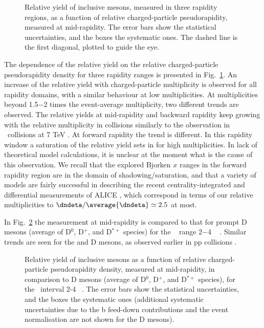 


 \begin{figure}[htb]
  {\centering 
{} 
\par}
\caption{\label{fig:jpsiyield} Relative yield of inclusive \jpsi mesons, measured in three rapidity regions, as a function of relative charged-particle pseudorapidity, measured at mid-rapidity.
The error bars show the statistical uncertainties, and the boxes the systematic ones.
The dashed line is the first diagonal, plotted to guide the eye.
}
\end{figure}

The dependence of the relative \jpsi yield on the relative charged-particle pseudorapidity density for three \jpsi rapidity ranges is presented in Fig.~\ref{fig:jpsiyield}. An increase of the relative yield with charged-particle multiplicity is observed for all rapidity domains, with a similar behaviour at low multiplicities. At multiplicities beyond 1.5$-$2 times the event-average multiplicity, two different trends are observed. The relative yields at mid-rapidity and backward rapidity keep growing with the relative multiplicity in \ppb collisions similarly to the observation in \pp ~collisions at 7 TeV \cite{Abelev:2012aa}. At forward rapidity the trend is different. In this rapidity window a saturation of the relative yield sets in for high multiplicities. In lack of theoretical model calculations, it is unclear at the moment what is the cause of this observation.
We recall that the explored Bjorken $x$ ranges in the forward rapidity region are in the domain of shadowing/saturation, and that a variety of models \cite{Vogt:2013aa,Arleo:2013aa,Ferreiro:2014bia,Ma:2015sia,Ducloue:2015gfa} are fairly successful in describing the recent centrality-integrated and differential measurements of ALICE \cite{Adam:2015ac,Adam:2015jsa}, which correspond in terms of our relative multiplicities to $\dndeta/\average{\dndeta}\simeq2.5$ at most.

In Fig.~\ref{fig:jpsi2d} the \jpsi measurement at mid-rapidity is compared to that for prompt D mesons (average of D$^0$, D$^+$, and D$^{*+}$ species) for the \pt~ range 2$-$4 \gevc~ \cite{Adam:2016mkz}. Similar trends are seen for the \jpsi and D mesons, as observed earlier in pp collisions \cite{Adam:2015ota}. 

 \begin{figure}[htb]
  {\centering 
{}
\par}
\caption{\label{fig:jpsi2d} Relative yield of inclusive \jpsi mesons as a function of relative charged-particle pseudorapidity density, measured at mid-rapidity, in comparison to D mesons (average of D$^0$, D$^+$, and D$^{*+}$ species), for the \pt ~interval 2-4 \gevc ~\cite{Adam:2016mkz}.
The error bars show the statistical uncertainties, and the boxes the systematic ones (additional systematic uncertainties due to the b feed-down contributions and the event normalisation are not shown for the D mesons).
}
\end{figure}


